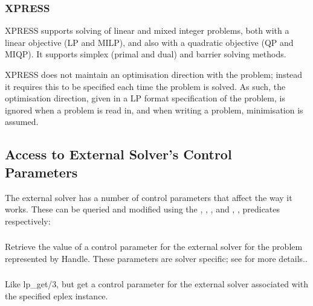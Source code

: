 \subsubsection{XPRESS}
XPRESS supports solving of linear and mixed integer problems, both with a
linear objective (LP and MILP), and also with a quadratic objective (QP and
MIQP). It supports simplex (primal and dual) and barrier solving methods.

XPRESS does not maintain an optimisation direction with the problem;
instead it requires this to be specified each time the problem is
solved. As such, the optimisation direction, given in a LP format
specification of the problem, is ignored when a problem is read in, and
when writing a problem, minimisation is assumed. 



\subsection{Access to External Solver's Control Parameters}

The external solver has a number of control
parameters that affect the way it works.
These can be queried and modified using the
,  
,
, and
, 
, 
 predicates respectively:

\subsubsection{}
Retrieve the value of a control parameter for the external solver for the
problem represented by Handle. These
parameters are solver specific; see
 for more details..

\subsubsection{}
Like lp_get/3, but get a control parameter for the external solver
associated with the specified eplex instance. 

